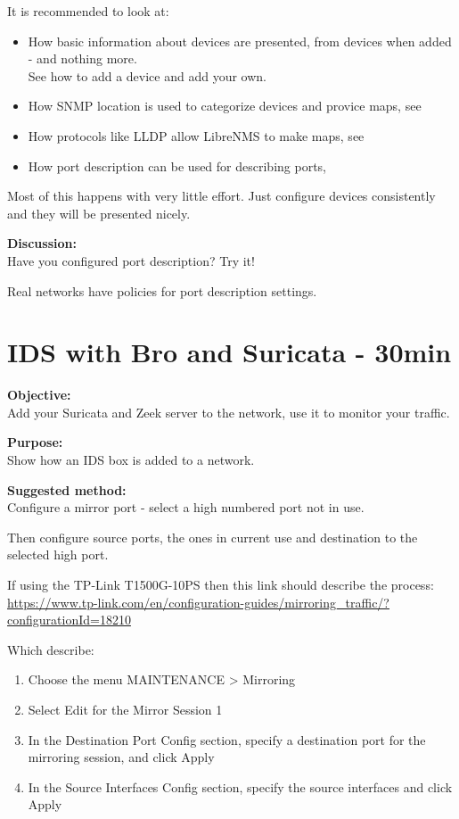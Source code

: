 \documentclass[a4paper,11pt,notitlepage]{report}
\begin{document}
It is recommended to look at:
\begin{itemize}
\item How basic information about devices are presented, from devices when added - and nothing more.\\
See how to add a device and add your own. 
\item How SNMP location is used to categorize devices and provice maps, see 
\item How protocols like LLDP allow LibreNMS to make maps, see 
\item How port description can be used for describing ports, 
\end{itemize}

Most of this happens with very little effort. Just configure devices consistently and they will be presented nicely.

{\bf Discussion:}\\
Have you configured port description? Try it!

Real networks have policies for port description settings.

\chapter{IDS with Bro and Suricata - 30min}
\label{ex:suricata-real-network}

{\bf Objective:}\\
Add your Suricata and Zeek server to the network, use it to monitor your traffic.

{\bf Purpose:}\\
Show how an IDS box is added to a network.

{\bf Suggested method:}\\
Configure a mirror port - select a high numbered port not in use.

Then configure source ports, the ones in current use and destination to the selected high port.

If using the TP-Link T1500G-10PS then this link should describe the process:\\
{\small\url{https://www.tp-link.com/en/configuration-guides/mirroring_traffic/?configurationId=18210}}

Which describe:
\begin{enumerate}
\item Choose the menu MAINTENANCE > Mirroring
\item Select Edit for the Mirror Session 1
\item In the Destination Port Config section, specify a destination port for the mirroring session, and click Apply
\item In the Source Interfaces Config section, specify the source interfaces and click Apply
\end{enumerate}
\end{document}
